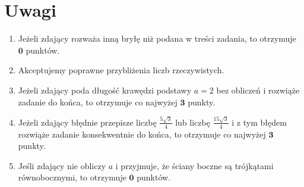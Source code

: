 \documentclass[10pt]{article}
\begin{document}
\section*{Uwagi}
\begin{enumerate}
  \item Jeżeli zdający rozważa inną bryłę niż podana w treści zadania, to otrzymuje $\mathbf{0}$ punktów.
  \item Akceptujemy poprawne przybliżenia liczb rzeczywistych.
  \item Jeżeli zdający poda długość krawędzi podstawy $a=2$ bez obliczeń i rozwiąże zadanie do końca, to otrzymuje co najwyżej $\mathbf{3}$ punkty.
  \item Jeżeli zdający błędnie przepisze liczbę $\frac{5 \sqrt{3}}{4}$ lub liczbę $\frac{15 \sqrt{3}}{4}$ i z tym błędem rozwiąże zadanie konsekwentnie do końca, to otrzymuje co najwyżej $\mathbf{3}$ punkty.
  \item Jeśli zdający nie obliczy $a$ i przyjmuje, że ściany boczne są trójkątami równobocznymi, to otrzymuje $\mathbf{0}$ punktów.
\end{enumerate}
\end{document}
